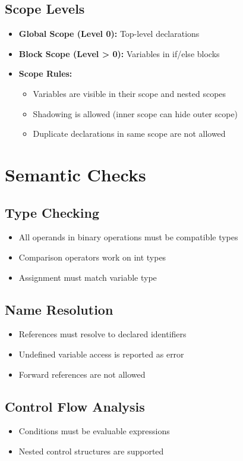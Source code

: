 \documentclass[12pt,a4paper]{report}
\begin{document}
\subsection{Scope Levels}
\begin{itemize}
    \item \textbf{Global Scope (Level 0):} Top-level declarations
    \item \textbf{Block Scope (Level > 0):} Variables in if/else blocks
    \item \textbf{Scope Rules:}
    \begin{itemize}
        \item Variables are visible in their scope and nested scopes
        \item Shadowing is allowed (inner scope can hide outer scope)
        \item Duplicate declarations in same scope are not allowed
    \end{itemize}
\end{itemize}

\section{Semantic Checks}

\subsection{Type Checking}
\begin{itemize}
    \item All operands in binary operations must be compatible types
    \item Comparison operators work on int types
    \item Assignment must match variable type
\end{itemize}

\subsection{Name Resolution}
\begin{itemize}
    \item References must resolve to declared identifiers
    \item Undefined variable access is reported as error
    \item Forward references are not allowed
\end{itemize}

\subsection{Control Flow Analysis}
\begin{itemize}
    \item Conditions must be evaluable expressions
    \item Nested control structures are supported
\end{itemize}
\end{document}
